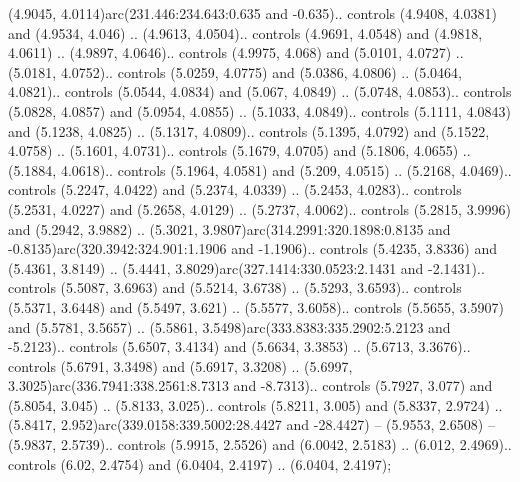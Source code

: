 \begin{scope}[draw=black,line width=0.0422cm,miter limit=10.0]
(4.9045, 4.0114)arc(231.446:234.643:0.635 and -0.635).. controls (4.9408, 4.0381) and (4.9534, 4.046) .. (4.9613, 4.0504).. controls (4.9691, 4.0548) and (4.9818, 4.0611) .. (4.9897, 4.0646).. controls (4.9975, 4.068) and (5.0101, 4.0727) .. (5.0181, 4.0752).. controls (5.0259, 4.0775) and (5.0386, 4.0806) .. (5.0464, 4.0821).. controls (5.0544, 4.0834) and (5.067, 4.0849) .. (5.0748, 4.0853).. controls (5.0828, 4.0857) and (5.0954, 4.0855) .. (5.1033, 4.0849).. controls (5.1111, 4.0843) and (5.1238, 4.0825) .. (5.1317, 4.0809).. controls (5.1395, 4.0792) and (5.1522, 4.0758) .. (5.1601, 4.0731).. controls (5.1679, 4.0705) and (5.1806, 4.0655) .. (5.1884, 4.0618).. controls (5.1964, 4.0581) and (5.209, 4.0515) .. (5.2168, 4.0469).. controls (5.2247, 4.0422) and (5.2374, 4.0339) .. (5.2453, 4.0283).. controls (5.2531, 4.0227) and (5.2658, 4.0129) .. (5.2737, 4.0062).. controls (5.2815, 3.9996) and (5.2942, 3.9882) .. (5.3021, 3.9807)arc(314.2991:320.1898:0.8135 and -0.8135)arc(320.3942:324.901:1.1906 and -1.1906).. controls (5.4235, 3.8336) and (5.4361, 3.8149) .. (5.4441, 3.8029)arc(327.1414:330.0523:2.1431 and -2.1431).. controls (5.5087, 3.6963) and (5.5214, 3.6738) .. (5.5293, 3.6593).. controls (5.5371, 3.6448) and (5.5497, 3.621) .. (5.5577, 3.6058).. controls (5.5655, 3.5907) and (5.5781, 3.5657) .. (5.5861, 3.5498)arc(333.8383:335.2902:5.2123 and -5.2123).. controls (5.6507, 3.4134) and (5.6634, 3.3853) .. (5.6713, 3.3676).. controls (5.6791, 3.3498) and (5.6917, 3.3208) .. (5.6997, 3.3025)arc(336.7941:338.2561:8.7313 and -8.7313).. controls (5.7927, 3.077) and (5.8054, 3.045) .. (5.8133, 3.025).. controls (5.8211, 3.005) and (5.8337, 2.9724) .. (5.8417, 2.952)arc(339.0158:339.5002:28.4427 and -28.4427) -- (5.9553, 2.6508) -- (5.9837, 2.5739).. controls (5.9915, 2.5526) and (6.0042, 2.5183) .. (6.012, 2.4969).. controls (6.02, 2.4754) and (6.0404, 2.4197) .. (6.0404, 2.4197);




\end{scope}
